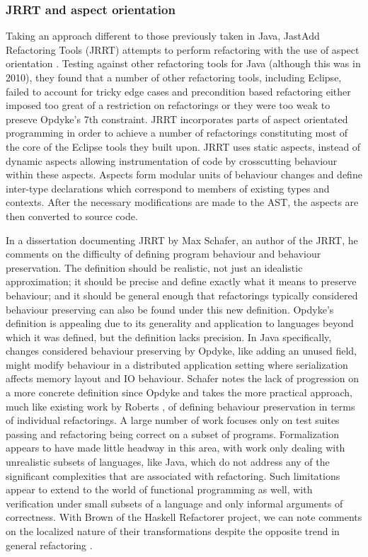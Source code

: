\subsubsection{JRRT and aspect orientation}
Taking an approach different to those previously taken in Java, JastAdd Refactoring Tools (JRRT) attempts to perform refactoring with the use of aspect orientation \cite{schafer2010specification}. Testing against other refactoring tools for Java (although this was in 2010), they found that a number of other refactoring tools, including Eclipse, failed to account for tricky edge cases and precondition based refactoring either imposed too great of a restriction on refactorings or they were too weak to preseve Opdyke's 7th constraint. JRRT incorporates parts of aspect orientated programming in order to achieve a number of refactorings constituting most of the core of the Eclipse tools they built upon. JRRT uses static aspects, instead of dynamic aspects allowing instrumentation of code by crosscutting behaviour within these aspects. Aspects form modular units of behaviour changes and define inter-type declarations which correspond to members of existing types and contexts. After the necessary modifications are made to the AST, the aspects are then converted to source code.

In a dissertation documenting JRRT by Max Schafer, an author of the JRRT, he comments on the difficulty of defining program behaviour and behaviour preservation. The definition should be realistic, not just an idealistic approximation; it should be precise and define exactly what it means to preserve behaviour; and it should be general enough that refactorings typically considered behaviour preserving can also be found under this new definition. Opdyke's definition is appealing due to its generality and application to languages beyond which it was defined, but the definition lacks precision. In Java specifically, changes considered behaviour preserving by Opdyke, like adding an unused field, might modify behaviour in a distributed application setting where serialization affects memory layout and IO behaviour. Schafer notes the lack of progression on a more concrete definition since Opdyke and takes the more practical approach, much like existing work by Roberts \cite[p. 111]{schafer2010specification}, of defining behaviour preservation in terms of individual refactorings. A large number of work focuses only on test suites passing and refactoring being correct on a subset of programs. Formalization appears to have made little headway in this area, with work only dealing with unrealistic subsets of languages, like Java, which do not address any of the significant complexities that are associated with refactoring. Such limitations appear to extend to the world of functional programming as well, with verification under small subsets of a language and only informal arguments of correctness. With Brown of the Haskell Refactorer project, we can note comments on the localized nature of their transformations despite the opposite trend in general refactoring \cite{brown2008tool}.

